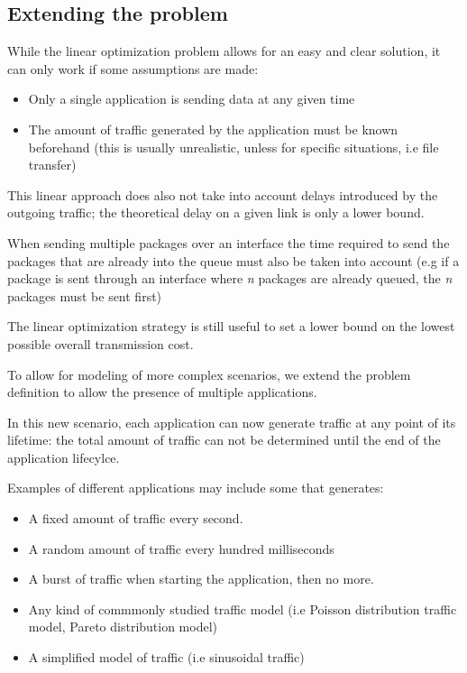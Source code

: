 	
	
	\subsection{Extending the problem}
	While the linear optimization problem allows for an easy and clear solution, it can only work if some assumptions are made:
	
	\begin{itemize}
		\item Only a single application is sending data at any given time
		\item The amount of traffic generated by the application must be known beforehand (this is usually unrealistic, unless for specific situations, i.e file transfer)
	\end{itemize}
	
	This linear approach does also not take into account delays introduced by the outgoing traffic; the theoretical delay on a given link is only a lower bound.
	
	When sending multiple packages over an interface the time required to send the packages that are already into the queue must also be taken into account (e.g if  a package is sent through an interface where \textit{n} packages are already queued, the \textit{n} packages must be sent first)
	
	The linear optimization strategy is still useful to set a lower bound on the lowest possible overall transmission cost.
	
	To allow for modeling of more complex scenarios, we extend the problem definition to allow the presence of multiple applications.
	
	In this new scenario, each application can now generate traffic at any point of its lifetime: the total amount of traffic can not be determined until the end of the application lifecylce.
	
	Examples of different applications may include some that generates:
	\begin{itemize}
		\item A fixed amount of traffic every second.
		\item A random amount of traffic every hundred milliseconds
		\item A burst of traffic when starting the application, then no more.
		\item Any kind of commmonly studied traffic model (i.e Poisson distribution traffic model, Pareto distribution model)
		\item A simplified model of traffic (i.e sinusoidal traffic)
	\end{itemize}

